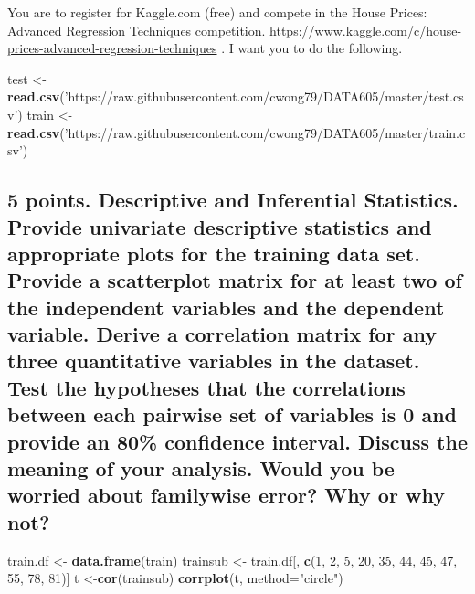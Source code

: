 \documentclass[]{article}
\newenvironment{Shaded}{\begin{snugshade}}{\end{snugshade}}
\newcommand{\KeywordTok}[1]{\textcolor[rgb]{0.13,0.29,0.53}{\textbf{#1}}}
\newcommand{\DataTypeTok}[1]{\textcolor[rgb]{0.13,0.29,0.53}{#1}}
\newcommand{\DecValTok}[1]{\textcolor[rgb]{0.00,0.00,0.81}{#1}}
\newcommand{\StringTok}[1]{\textcolor[rgb]{0.31,0.60,0.02}{#1}}
\newcommand{\NormalTok}[1]{#1}
\begin{document}
You are to register for Kaggle.com (free) and compete in the House
Prices: Advanced Regression Techniques competition.
\url{https://www.kaggle.com/c/house-prices-advanced-regression-techniques}
. I want you to do the following.

\begin{Shaded}
\begin{Highlighting}[]
\NormalTok{test <-}\StringTok{ }\KeywordTok{read.csv}\NormalTok{(}\StringTok{'https://raw.githubusercontent.com/cwong79/DATA605/master/test.csv'}\NormalTok{)}
\NormalTok{train <-}\StringTok{ }\KeywordTok{read.csv}\NormalTok{(}\StringTok{'https://raw.githubusercontent.com/cwong79/DATA605/master/train.csv'}\NormalTok{)}
\end{Highlighting}
\end{Shaded}

\subsection{5 points. Descriptive and Inferential Statistics. Provide
univariate descriptive statistics and appropriate plots for the training
data set. Provide a scatterplot matrix for at least two of the
independent variables and the dependent variable. Derive a correlation
matrix for any three quantitative variables in the dataset. Test the
hypotheses that the correlations between each pairwise set of variables
is 0 and provide an 80\% confidence interval. Discuss the meaning of
your analysis. Would you be worried about familywise error? Why or why
not?}\label{points.-descriptive-and-inferential-statistics.-provide-univariate-descriptive-statistics-and-appropriate-plots-for-the-training-data-set.-provide-a-scatterplot-matrix-for-at-least-two-of-the-independent-variables-and-the-dependent-variable.-derive-a-correlation-matrix-for-any-three-quantitative-variables-in-the-dataset.-test-the-hypotheses-that-the-correlations-between-each-pairwise-set-of-variables-is-0-and-provide-an-80-confidence-interval.-discuss-the-meaning-of-your-analysis.-would-you-be-worried-about-familywise-error-why-or-why-not}

\begin{Shaded}
\begin{Highlighting}[]
\NormalTok{train.df <-}\StringTok{ }\KeywordTok{data.frame}\NormalTok{(train)}
\NormalTok{trainsub <-}\StringTok{ }\NormalTok{train.df[, }\KeywordTok{c}\NormalTok{(}\DecValTok{1}\NormalTok{, }\DecValTok{2}\NormalTok{, }\DecValTok{5}\NormalTok{, }\DecValTok{20}\NormalTok{, }\DecValTok{35}\NormalTok{, }\DecValTok{44}\NormalTok{, }\DecValTok{45}\NormalTok{, }\DecValTok{47}\NormalTok{, }\DecValTok{55}\NormalTok{, }\DecValTok{78}\NormalTok{, }\DecValTok{81}\NormalTok{)]}
\NormalTok{t <-}\KeywordTok{cor}\NormalTok{(trainsub)}
\KeywordTok{corrplot}\NormalTok{(t, }\DataTypeTok{method=}\StringTok{"circle"}\NormalTok{)}
\end{Highlighting}
\end{Shaded}
\end{document}
